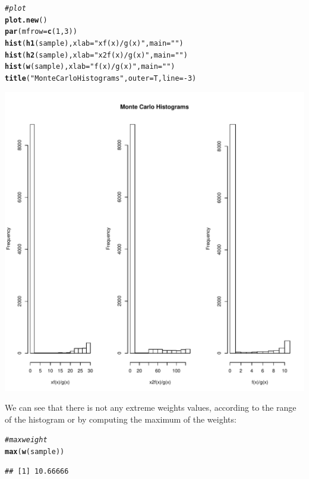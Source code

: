 \documentclass[11pt]{article}\usepackage[]{graphicx}\usepackage[]{color}
\makeatletter
\def\maxwidth{ %
  \ifdim\Gin@nat@width>\linewidth
    \linewidth
  \else
    \Gin@nat@width
  \fi
}
\newcommand{\hlnum}[1]{\textcolor[rgb]{0.686,0.059,0.569}{#1}}%
\newcommand{\hlstr}[1]{\textcolor[rgb]{0.192,0.494,0.8}{#1}}%
\newcommand{\hlcom}[1]{\textcolor[rgb]{0.678,0.584,0.686}{\textit{#1}}}%
\newcommand{\hlopt}[1]{\textcolor[rgb]{0,0,0}{#1}}%
\newcommand{\hlstd}[1]{\textcolor[rgb]{0.345,0.345,0.345}{#1}}%
\newcommand{\hlkwc}[1]{\textcolor[rgb]{0.333,0.667,0.333}{#1}}%
\newcommand{\hlkwd}[1]{\textcolor[rgb]{0.737,0.353,0.396}{\textbf{#1}}}%
\newenvironment{kframe}{%
 \def\at@end@of@kframe{}%
 \ifinner\ifhmode%
  \def\at@end@of@kframe{\end{minipage}}%
  \begin{minipage}{\columnwidth}%
 \fi\fi%
 \def\FrameCommand##1{\hskip\@totalleftmargin \hskip-\fboxsep
 \colorbox{shadecolor}{##1}\hskip-\fboxsep
     \hskip-\linewidth \hskip-\@totalleftmargin \hskip\columnwidth}%
 \MakeFramed {\advance\hsize-\width
   \@totalleftmargin\z@ \linewidth\hsize
   \@setminipage}}%
 {\par\unskip\endMakeFramed%
 \at@end@of@kframe}
\newenvironment{knitrout}{}{} %
\makeatother
\begin{document}
\begin{knitrout}
\color{fgcolor}\begin{kframe}
\begin{alltt}
\hlcom{#plot}
\hlkwd{plot.new}\hlstd{()}
\hlkwd{par}\hlstd{(}\hlkwc{mfrow}\hlstd{=}\hlkwd{c}\hlstd{(}\hlnum{1}\hlstd{,}\hlnum{3}\hlstd{))}
\hlkwd{hist}\hlstd{(}\hlkwd{h1}\hlstd{(sample),}\hlkwc{xlab}\hlstd{=}\hlstr{"xf(x)/g(x)"}\hlstd{,}\hlkwc{main}\hlstd{=}\hlstr{""}\hlstd{)}
\hlkwd{hist}\hlstd{(}\hlkwd{h2}\hlstd{(sample),}\hlkwc{xlab}\hlstd{=}\hlstr{"x2f(x)/g(x)"}\hlstd{,}\hlkwc{main}\hlstd{=}\hlstr{""}\hlstd{)}
\hlkwd{hist}\hlstd{(}\hlkwd{w}\hlstd{(sample),}\hlkwc{xlab}\hlstd{=}\hlstr{"f(x)/g(x)"}\hlstd{,}\hlkwc{main}\hlstd{=}\hlstr{""}\hlstd{)}
\hlkwd{title}\hlstd{(}\hlstr{"Monte Carlo Histograms"}\hlstd{,}\hlkwc{outer}\hlstd{=T,}\hlkwc{line}\hlstd{=}\hlopt{-}\hlnum{3}\hlstd{)}
\end{alltt}
\end{kframe}
\includegraphics[width=\maxwidth]{figure/unnamed-chunk-8-1} 

\end{knitrout}

We can see that there is not any extreme weights values, according to the range of the histogram or by computing the maximum of the weights:
\begin{knitrout}
\color{fgcolor}\begin{kframe}
\begin{alltt}
\hlcom{#maxweight}
\hlkwd{max}\hlstd{(}\hlkwd{w}\hlstd{(sample))}
\end{alltt}
\begin{verbatim}
## [1] 10.66666
\end{verbatim}
\end{kframe}
\end{knitrout}
\end{document}
